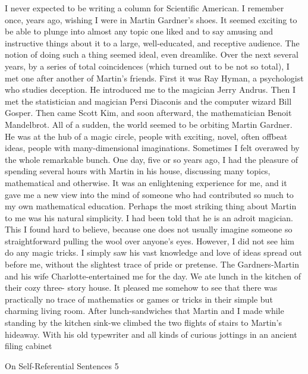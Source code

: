 I never expected to be writing a column for Scientific American. I remember once, years
ago, wishing I were in Martin Gardner's shoes. It seemed exciting to be able to plunge
into almost any topic one liked and to say amusing and instructive things about it to a
large, well-educated, and receptive audience. The notion of doing such a thing seemed
ideal, even dreamlike. Over the next several years, by a series of total coincidences
(which turned out to be not so total), I met one after another of Martin's friends. First it
was Ray Hyman, a psychologist who studies deception. He introduced me to the
magician Jerry Andrus. Then I met the statistician and magician Persi Diaconis and the
computer wizard Bill Gosper. Then came Scott Kim, and soon afterward, the
mathematician Benoit Mandelbrot. All of a sudden, the world seemed to be orbiting
Martin Gardner. He was at the hub of a magic circle, people with exciting, novel, often
offbeat ideas, people with many-dimensional imaginations. Sometimes I felt overawed by
the whole remarkable bunch.
        One day, five or so years ago, I had the pleasure of spending several hours with
Martin in his house, discussing many topics, mathematical and otherwise. It was an
enlightening experience for me, and it gave me a new view into the mind of someone
who had contributed so much to my own mathematical education. Perhaps the most
striking thing about Martin to me was his natural simplicity. I had been told that he is an
adroit magician. This I found hard to believe, because one does not usually imagine
someone so straightforward pulling the wool over anyone's eyes. However, I did not see
him do any magic tricks. I simply saw his vast knowledge and love of ideas spread out
before me, without the slightest trace of pride or pretense. The Gardners-Martin and his
wife Charlotte-entertained me for the day. We ate lunch in the kitchen of their cozy three-
story house. It pleased me somehow to see that there was practically no trace of
mathematics or games or tricks in their simple but charming living room.
After lunch-sandwiches that Martin and I made while standing by the kitchen sink-we
climbed the two flights of stairs to Martin's hideaway. With his old typewriter and all
kinds of curious jottings in an ancient filing cabinet




On Self-Referential Sentences                                                             5

